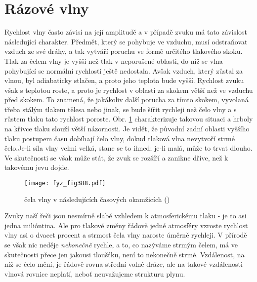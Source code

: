 \section{Rázové vlny}\label{fyz:IchapLIsecII}
  Rychlost vlny často závisí na její amplitudě a v případě zvuku má tato závislost následující 
  charakter. Předmět, který se pohybuje ve vzduchu, musí odstraňovat vzduch ze své dráhy, a tak 
  vytváří poruchu ve formě určitého tlakového skoku. Tlak za čelem vlny je vyšší než tlak v 
  neporušené oblasti, do níž se vlna pohybující se normální rychlostí ještě nedostala. Avšak 
  vzduch, který zůstal za vlnou, byl adiabaticky stlačen, a proto jeho teplota bude vyšší. Rychlost 
  zvuku však s teplotou roste, a proto je rychlost v oblasti za skokem větší než ve vzduchu před 
  skokem. To znamená, že jakákoliv další porucha za tímto skokem, vyvolaná třeba stálým tlakem 
  tělesa nebo jinak, se bude šířit rychleji než čelo vlny a s růstem tlaku tato rychlost poroste. 
  Obr. \ref{fyz:fig388} charakterizuje takovou situaci a hrboly na křivce tlaku slouží větší 
  názornosti. Je vidět, že původní zadní oblasti vyššího tlaku postupem času dobíhají čelo vlny, 
  dokud tlaková vlna nevytvoří strmé čelo.Je-li síla vlny velmi velká, stane se to ihned; je-li 
  malá, může to trvat dlouho. Ve skutečnosti se však může stát, že zvuk se rozšíří a zanikne dříve, 
  než k takovému jevu dojde.
  \begin{figure}[ht!] %
    \centering
    \texttt{[image: fyz\_fig388.pdf]}
    \caption{ čela vlny v následujících časových okamžicích
             (\cite[s.~688]{Feynman01})}
    \label{fyz:fig388}
  \end{figure}
  
  Zvuky naší řeči jsou nesmírně slabé vzhledem k atmosferickému tlaku - je to asi jedna milióntina. 
  Ale pro tlakové změny řádově jedné atmosféry vzroste rychlost vlny asi o dvacet procent a strmost 
  čela vlny naroste úměrně rychleji. V přírodě se však nic neděje \emph{nekonečně} rychle, a to, co 
  nazýváme strmým čelem, má ve skutečnosti přece jen jakousi tloušťku, není to nekonečně strmé. 
  Vzdálenost, na níž se čelo mění, je řádově rovna střední volné dráze, ale na takové vzdálenosti 
  vlnová rovnice neplatí, neboť neuvažujeme strukturu plynu.
  
